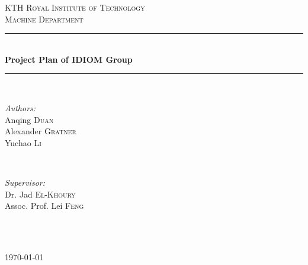 \documentclass[12pt]{article} %
\begin{document}

\begin{titlepage}

\newcommand{\HRule}{\rule{\linewidth}{0.5mm}} %

\center %

\textsc{\LARGE KTH Royal Institute of Technology}\\[1.5cm] %
\textsc{\Large Machine Department}\\[0.5cm] %


\HRule \\[0.4cm]
{ \huge \bfseries Project Plan of IDIOM Group}\\[0.4cm] %
\HRule \\[1.5cm]

\begin{minipage}{0.4\textwidth}
\begin{flushleft} \large
\emph{Authors:}\\
Anqing \textsc{Duan}\\
Alexander \textsc{Gratner}\\
Yuchao \textsc{Li}
\end{flushleft}
\end{minipage}
~
\begin{minipage}{0.4\textwidth}
\begin{flushright} \large
\emph{Supervisor:} \\
Dr. Jad \textsc{El-Khoury}\\
Assoc. Prof. Lei \textsc{Feng} %
\end{flushright}
\end{minipage}\\[1cm]

\begin{figure}[!h]
  \centering

      \label{fig:Triangulation}
\end{figure}

\begin{minipage}{0.4\textwidth}
\end{minipage}\\[1cm]
{\large \today}\\[3cm] %


\vfill %

\end{titlepage}
\end{document}
